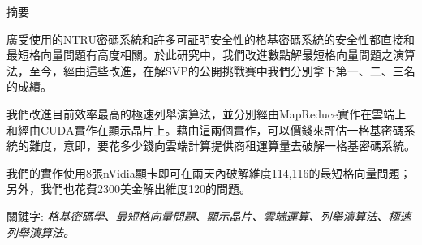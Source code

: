

\doublespacing

%
\onehalfspacing

\begin{titlepage}
\begin{CJK}{UTF8}{bkai}
\begin{center}
\Large{{摘要}}\\
\end{center}

    廣受使用的NTRU密碼系統和許多可証明安全性的格基密碼系統的安全性都直接和最短格向量問題有高度相關。於此研究中，我們改進數點解最短格向量問題之演算法，至今，經由這些改進，在解SVP的公開挑戰賽中我們分別拿下第一、二、三名的成績。

    我們改進目前效率最高的極速列舉演算法，並分別經由MapReduce實作在雲端上和經由CUDA實作在顯示晶片上。藉由這兩個實作，可以價錢來評估一格基密碼系統的難度，意即，要花多少錢向雲端計算提供商租運算量去破解一格基密碼系統。

    我們的實作使用8張nVidia顯卡即可在兩天內破解維度114,116的最短格向量問題；另外，我們也花費2300美金解出維度120的問題。




\vspace*{5em}

{關鍵字:} \emph{格基密碼學、最短格向量問題、顯示晶片、雲端運算、列舉演算法、極速列舉演算法。}


\end{CJK}
\end{titlepage}

%
